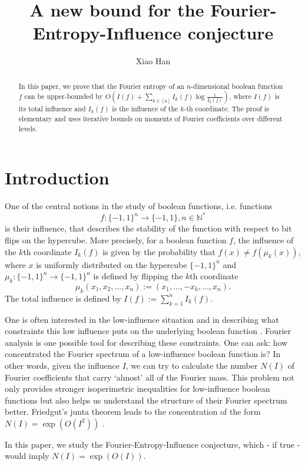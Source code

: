 \documentclass[10pt]{article} \usepackage[utf8]{inputenc}
\title{A new bound for the Fourier-Entropy-Influence conjecture}
\author{Xiao Han}
\date{}
\theoremstyle{definition}
\theoremstyle{remark}
\numberwithin{equation}{section}
\begin{document}
\maketitle
\begin{abstract}
In this paper, we prove that the Fourier entropy of an $n$-dimensional boolean function $f$ can be upper-bounded by $O(I(f)+ \sum\limits_{k\in[n]}I_k(f)\log \frac{1}{I_k(f)})$, where $I(f)$ is its total influence and $I_k(f)$ is the influence of the $k$-th coordinate. The proof is elementary and uses iterative bounds on moments of Fourier coefficients over different levels.
\\
\end{abstract}
\section{Introduction}
One of the central notions in the study of boolean functions, i.e. functions 
$$f:\{-1,1\}^{n} \to \{-1,1\} , n\in \mathbb{N}^*$$
is their influence, that describes the stability of the function with respect to bit flips on the hypercube. More precisely, for a boolean function $f$, the influence of the $k$th coordinate $I_k(f)$ is given by the probability that $f(x)\neq f(\mu_k(x))$, where $x$ is uniformly distributed on the hypercube $\{-1,1\}^n$ and $\mu_k:\{-1,1\}^n \to \{-1,1\}^n$ is defined by flipping the $k$th coordinate $$\mu_k(x_1, x_2, \dots, x_n):=(x_1, \dots, -x_k, \dots, x_n).$$
The total influence is defined by $I(f):=\sum\limits_{k=1}^{n}I_k(f)$.

One is often interested in the low-influence situation and in describing what constraints this low influence puts on the underlying boolean function \cite{6, 15, 16}. Fourier analysis is one possible tool for describing these constraints. One can ask: how concentrated the Fourier spectrum of a low-influence boolean function is? In other words, given the influence $I$, we can try to calculate the number $N(I)$ of Fourier coefficients that carry `almost' all of the Fourier mass. This problem not only provides stronger isoperimetric inequalities for low-influence boolean functions but also helps us understand the structure of their Fourier spectrum better. Friedgut's junta theorem leads to the concentration of the form $N(I)=\exp(O(I^2))$ \cite{16}. 

In this paper, we study the Fourier-Entropy-Influence conjecture, which - if true - would imply $N(I)=\exp(O(I))$.
\end{document}
